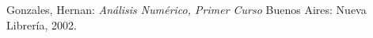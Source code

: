 \documentclass[11pt,a4paper]{article}
\begin{document}
\newpage

{}
\renewcommand\refname{Bibliografía}
\begin{thebibliography}{9}

Gonzales, Hernan: 
\textit{Análisis Numérico, Primer Curso}
Buenos Aires: Nueva Librería, 2002.

\end{thebibliography}
\end{document}
